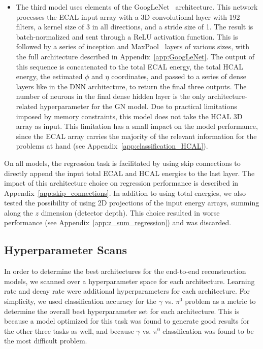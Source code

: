 \begin{itemize}
    \item The third model uses elements of the GoogLeNet~\cite{GoogLeNet} architecture. This network processes the ECAL input array with a 3D convolutional layer with 192 filters, a kernel size of 3 in all directions, and a stride size of 1. The result is batch-normalized and sent through a ReLU activation function. This is followed by a series of inception and MaxPool~\cite{conv} layers of various sizes, with the full architecture described in Appendix~\ref{app:GoogLeNet}. The output of this sequence is concatenated to the total ECAL energy, the total HCAL energy, the estimated $\phi$ and $\eta$ coordinates, and passed to a series of dense layers like in the DNN architecture, to return the final three outputs. The number of neurons in the final dense hidden layer is the only architecture-related hyperparameter for the GN model. Due to practical limitations imposed by memory constraints, this model does not take the HCAL 3D array as input. This limitation has a small impact on the model performance, since the ECAL array carries the majority of the relevant information for the problems at hand (see Appendix~\ref{app:classification_HCAL}).
\end{itemize}

On all models, the regression task is facilitated by using skip connections to directly append the input total ECAL and HCAL energies to the last layer. The impact of this architecture choice on regression performance is described in Appendix~\ref{app:skip_connections}. In addition to using total energies, we also tested the possibility of using 2D projections of the input energy arrays, summing along the $z$ dimension (detector depth). This choice resulted in worse performance (see Appendix~\ref{app:z_sum_regression}) and was discarded.

\subsection{Hyperparameter Scans}
\label{sec:hpscan}

In order to determine the best architectures for the end-to-end reconstruction models, we scanned over a hyperparameter space for each architecture. Learning rate and decay rate were additional hyperparameters for each architecture. For simplicity, we used classification accuracy for the $\gamma$ vs. $\pi^0$ problem as a metric to determine the overall best hyperparameter set for each architecture. This is because a model optimized for this task was found to generate good results for the other three tasks as well, and because $\gamma$ vs. $\pi^0$ classification was found to be the most difficult problem.

